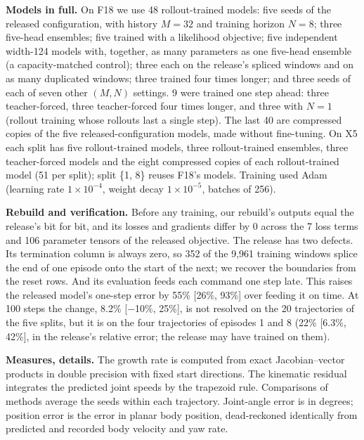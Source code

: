 \textbf{Models in full.} On F18 we use 48 rollout-trained models: five seeds of the released configuration, with
history $M=32$ and training horizon $N=8$; three five-head ensembles; five trained with a likelihood objective; five
independent width-124 models with, together, as many parameters as one five-head ensemble (a capacity-matched
control); three each on the release's spliced windows and on as many duplicated windows; three trained four times
longer; and three seeds of each of seven other $(M,N)$ settings. 9 were trained one step ahead: three
teacher-forced, three teacher-forced four times longer, and three with $N=1$ (rollout training whose rollouts last a
single step). The last 40 are compressed copies of the five released-configuration models, made without
fine-tuning. On X5 each split has five rollout-trained models, three rollout-trained ensembles, three teacher-forced
models and the eight compressed copies of each rollout-trained model (51 per split); split \{1, 8\} reuses
F18's models. Training used Adam (learning rate $1\times10^{-4}$, weight decay $1\times10^{-5}$, batches of 256).

\textbf{Rebuild and verification.} Before any training, our rebuild's outputs equal the release's bit for bit, and
its losses and gradients differ by 0 across the 7 loss terms and 106 parameter
tensors of the released objective. The release has two defects. Its termination column is always zero, so
352 of the 9{,}961 training windows splice the end of one episode onto the start of the next; we
recover the boundaries from the reset rows. And its evaluation feeds each command one step late. This raises the
released model's one-step error by 55\% [26\%, 93\%] over feeding it on time. At 100 steps the change,
8.2\% [$-$10\%, 25\%], is not resolved on the 20 trajectories of the five splits, but it is on the four
trajectories of episodes 1 and 8 (22\% [6.3\%, 42\%], in the release's relative error; the
release may have trained on them).

\textbf{Measures, details.} The growth rate is computed from exact Jacobian--vector products in double precision with
fixed start directions. The kinematic residual integrates the predicted joint speeds by the trapezoid rule.
Comparisons of methods average the seeds within each trajectory. Joint-angle error is in degrees; position error is
the error in planar body position, dead-reckoned identically from predicted and recorded body velocity and yaw rate.

